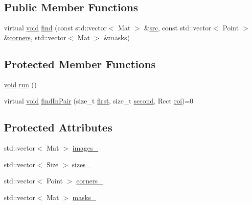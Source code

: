 \subsection*{Public Member Functions}
\begin{DoxyCompactItemize}
\item 
virtual \hyperlink{legacy_8hpp_a8bb47f092d473522721002c86c13b94e}{void} \hyperlink{classcv_1_1detail_1_1PairwiseSeamFinder_abae8c3f2f6723acc8bfcc4b59975f254}{find} (const std\-::vector$<$ Mat $>$ \&\hyperlink{legacy_8hpp_a371cd109b74033bc4366f584edd3dacc}{src}, const std\-::vector$<$ Point $>$ \&\hyperlink{imgproc__c_8h_a223e965e192c7025d6c6be77305f515b}{corners}, std\-::vector$<$ Mat $>$ \&masks)
\end{DoxyCompactItemize}
\subsection*{Protected Member Functions}
\begin{DoxyCompactItemize}
\item 
\hyperlink{legacy_8hpp_a8bb47f092d473522721002c86c13b94e}{void} \hyperlink{classcv_1_1detail_1_1PairwiseSeamFinder_a929964603a3e5d322245b83ac348cb13}{run} ()
\item 
virtual \hyperlink{legacy_8hpp_a8bb47f092d473522721002c86c13b94e}{void} \hyperlink{classcv_1_1detail_1_1PairwiseSeamFinder_a8e2d33396c0a012c7a256db8337435c6}{find\-In\-Pair} (size\-\_\-t \hyperlink{legacy_8hpp_abb508deecf21698b089fdaf6cf99209d}{first}, size\-\_\-t \hyperlink{legacy_8hpp_a580692a0f0a0ceba270e5d0ff61df21e}{second}, Rect \hyperlink{legacy_8hpp_a22e52b2b51d064865d3ac2f27b308c33}{roi})=0
\end{DoxyCompactItemize}
\subsection*{Protected Attributes}
\begin{DoxyCompactItemize}
\item 
std\-::vector$<$ Mat $>$ \hyperlink{classcv_1_1detail_1_1PairwiseSeamFinder_a6202e4edcd4051de88e8012ec998b4ea}{images\-\_\-}
\item 
std\-::vector$<$ Size $>$ \hyperlink{classcv_1_1detail_1_1PairwiseSeamFinder_a5abe230ead5af1b35d94cb3f2b867787}{sizes\-\_\-}
\item 
std\-::vector$<$ Point $>$ \hyperlink{classcv_1_1detail_1_1PairwiseSeamFinder_a73b7891ed68d55b25011fbcdb6d5f4da}{corners\-\_\-}
\item 
std\-::vector$<$ Mat $>$ \hyperlink{classcv_1_1detail_1_1PairwiseSeamFinder_a53c6eeed8de59b4b4e439c1fb8db14b9}{masks\-\_\-}
\end{DoxyCompactItemize}


